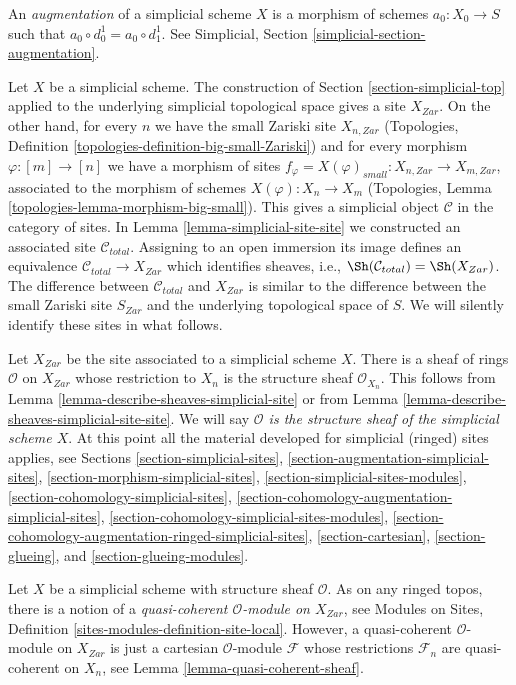 \medskip\noindent
An {\it augmentation} of a simplicial scheme $X$ is a morphism
of schemes $a_0 : X_0 \to S$ such that $a_0 \circ d^1_0 = a_0 \circ d^1_1$.
See Simplicial, Section \ref{simplicial-section-augmentation}.

\medskip\noindent
Let $X$ be a simplicial scheme. The construction of
Section \ref{section-simplicial-top} applied to the underlying
simplicial topological space gives a site $X_{Zar}$.
On the other hand, for every $n$ we have the small Zariski site
$X_{n, Zar}$ (Topologies, Definition
\ref{topologies-definition-big-small-Zariski})
and for every morphism $\varphi : [m] \to [n]$
we have a morphism of sites
$f_\varphi = X(\varphi)_{small} : X_{n, Zar} \to X_{m, Zar}$,
associated to the morphism of schemes
$X(\varphi) : X_n \to X_m$ (Topologies, Lemma
\ref{topologies-lemma-morphism-big-small}).
This gives a simplicial object $\mathcal{C}$ in the category of sites.
In Lemma \ref{lemma-simplicial-site-site} we constructed an associated
site $\mathcal{C}_{total}$. Assigning to an open immersion its image
defines an equivalence $\mathcal{C}_{total} \to X_{Zar}$ which
identifies sheaves, i.e., $\Sh(\mathcal{C}_{total}) = \Sh(X_{Zar})$.
The difference between $\mathcal{C}_{total}$ and $X_{Zar}$
is similar to the difference between the small Zariski site $S_{Zar}$
and the underlying topological space of $S$.
We will silently identify these sites in what follows.

\medskip\noindent
Let $X_{Zar}$ be the site associated to a simplicial scheme $X$.
There is a sheaf of rings $\mathcal{O}$ on $X_{Zar}$ whose restriction
to $X_n$ is the structure sheaf $\mathcal{O}_{X_n}$. This follows
from Lemma \ref{lemma-describe-sheaves-simplicial-site} or from
Lemma \ref{lemma-describe-sheaves-simplicial-site-site}. We will say
{\it $\mathcal{O}$ is the structure sheaf of the simplicial scheme $X$}.
At this point all the material developed for simplicial (ringed) sites
applies, see Sections \ref{section-simplicial-sites},
\ref{section-augmentation-simplicial-sites},
\ref{section-morphism-simplicial-sites},
\ref{section-simplicial-sites-modules},
\ref{section-cohomology-simplicial-sites},
\ref{section-cohomology-augmentation-simplicial-sites},
\ref{section-cohomology-simplicial-sites-modules},
\ref{section-cohomology-augmentation-ringed-simplicial-sites},
\ref{section-cartesian},
\ref{section-glueing}, and
\ref{section-glueing-modules}.

\medskip\noindent
Let $X$ be a simplicial scheme with structure sheaf $\mathcal{O}$.
As on any ringed topos, there is a notion
of a {\it quasi-coherent $\mathcal{O}$-module on $X_{Zar}$}, see
Modules on Sites, Definition \ref{sites-modules-definition-site-local}.
However, a quasi-coherent $\mathcal{O}$-module on $X_{Zar}$ is
just a cartesian $\mathcal{O}$-module $\mathcal{F}$ whose restrictions
$\mathcal{F}_n$ are quasi-coherent on $X_n$, see
Lemma \ref{lemma-quasi-coherent-sheaf}.

